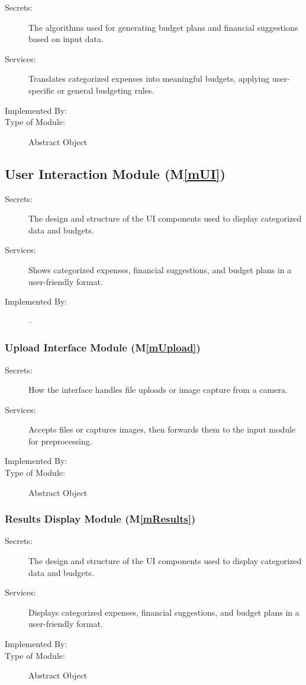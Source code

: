 \documentclass[12pt, titlepage]{article}
\newcommand{\mref}[1]{M\ref{#1}}
\begin{document}
\begin{description}
\item[Secrets:] The algorithms used for generating budget plans and financial suggestions based on input data.
\item[Services:] Translates categorized expenses into meaningful budgets, applying user-specific or general budgeting rules.
\item[Implemented By:] \progname
\item[Type of Module:] Abstract Object
\end{description}

\subsection{User Interaction Module (\mref{mUI})}

\begin{description}
\item[Secrets:] The design and structure of the UI components used to display categorized data and budgets.
\item[Services:] Shows categorized expenses, financial suggestions, and budget plans in a user-friendly format.
\item[Implemented By:] --
\end{description}

\subsubsection{Upload Interface Module (\mref{mUpload})}

\begin{description}
\item[Secrets:] How the interface handles file uploads or image capture from a camera.
\item[Services:] Accepts files or captures images, then forwards them to the input module for preprocessing.
\item[Implemented By:] \progname
\item[Type of Module:] Abstract Object
\end{description}

\subsubsection{Results Display Module (\mref{mResults})}

\begin{description}
\item[Secrets:] The design and structure of the UI components used to display categorized data and budgets.
\item[Services:] Displays categorized expenses, financial suggestions, and budget plans in a user-friendly format.
\item[Implemented By:] \progname
\item[Type of Module:] Abstract Object
\end{description}
\end{document}
